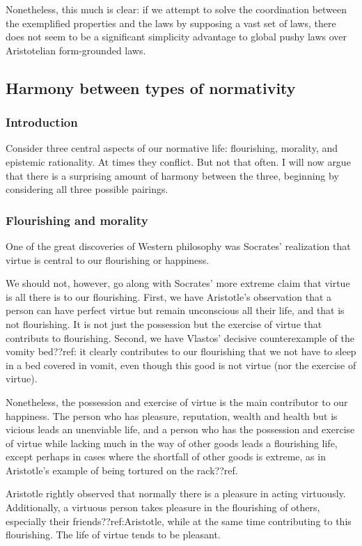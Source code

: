 Nonetheless, this much is clear: if we attempt to solve the coordination between the exemplified properties and 
the laws by supposing a vast set of laws, there does not seem to be a significant simplicity advantage to 
global pushy laws over Aristotelian form-grounded laws.

\subsection{Harmony between types of normativity}
\subsubsection{Introduction}
Consider three central aspects of our normative life: flourishing, morality, and epistemic rationality. At times 
they conflict. But not that often. I will now argue that there is a surprising amount of harmony between the three,
beginning by considering all three possible pairings.

\subsubsection{Flourishing and morality}
One of the great discoveries of Western philosophy was Socrates' realization that virtue is central to our flourishing
or happiness. 

We should not, however, go along with Socrates' more extreme claim that virtue is all there is to our flourishing. 
First, we have Aristotle's observation that a person can have perfect virtue but remain unconscious all their life,
and that is not flourishing. It is not just the possession but the exercise of virtue that contributs to flourishing.
Second, we have Vlastos' decisive counterexample of the vomity bed??ref: it clearly contributes to our flourishing that 
we not have to sleep in a bed covered in vomit, even though this good is not virtue (nor the exercise of virtue).

Nonetheless, the possession and exercise of virtue is the main contributor to our happiness. The person who
has pleasure, reputation, wealth and health but is vicious leads an unenviable life, and a person who has
the possession and exercise of virtue while lacking much in the way of other goods leads a flourishing life,
except perhaps in cases where the shortfall of other goods is extreme, as in Aristotle's example of being tortured
on the rack??ref. 

Aristotle rightly observed that normally there is a pleasure in acting virtuously. Additionally, a virtuous 
person takes pleasure in the flourishing of others, especially their friends??ref:Aristotle, while at the same time 
contributing to this flourishing. The life of virtue tends to be pleasant.

